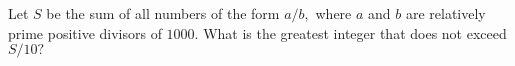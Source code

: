 Let $S$ be the sum of all numbers of the form $a/b,$ where $a$ and $b$ are relatively prime positive divisors of $1000.$ What is the greatest integer that does not exceed $S/10?$